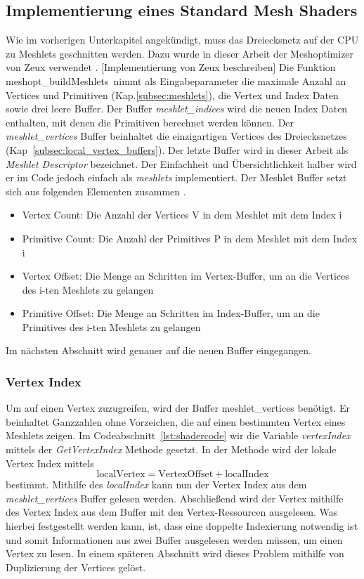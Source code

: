 \subsection{Implementierung eines Standard Mesh Shaders}
\label{subsec:standard_meshshaderimpl}
Wie im vorherigen Unterkapitel angekündigt, muss das Dreiecksnetz auf der CPU zu Meshlets geschnitten werden. 
Dazu wurde in dieser Arbeit der Meshoptimizer von Zeux verwendet \cite{Zeux}. 
[Implementierung von Zeux beschreiben]
Die Funktion \glqq meshopt\_buildMeshlets\grqq\ nimmt als Eingabeparameter die maximale Anzahl an Vertices und Primitiven (Kap.\ref{subsec:meshlets}), die Vertex und Index Daten sowie drei leere Buffer.
Der Buffer \textit{meshlet\_indices} wird die neuen Index Daten enthalten, mit denen die Primitiven berechnet werden können.
Der \textit{meshlet\_vertices} Buffer beinhaltet die einzigartigen Vertices des Dreiecksnetzes (Kap~\ref{subsec:local_vertex_buffers}).
Der letzte Buffer wird in dieser Arbeit als \textit{Meshlet Descriptor} bezeichnet.
Der Einfachheit und Übersichtlichkeit halber wird er im Code jedoch einfach als \textit{meshlets} implementiert.
Der Meshlet Buffer setzt sich aus folgenden Elementen zusammen \cite{Jensen2023}.
\begin{itemize}
\item Vertex Count: Die Anzahl der Vertices V in dem Meshlet mit dem Index i
\item Primitive Count: Die Anzahl der Primitives P in dem Meshlet mit dem Index i
\item Vertex Offset: Die Menge an Schritten im Vertex-Buffer, um an die Vertices des i-ten Meshlets zu gelangen
\item Primitive Offset: Die Menge an Schritten im Index-Buffer, um an die Primitives des i-ten Meshlets zu gelangen
\end{itemize} 
Im nächsten Abschnitt wird genauer auf die neuen Buffer eingegangen. \newline

\subsubsection*{Vertex Index}
Um auf einen Vertex zuzugreifen, wird der Buffer meshlet\_vertices benötigt.
Er beinhaltet Ganzzahlen ohne Vorzeichen, die auf einen bestimmten Vertex eines Meshlets zeigen.
Im Codeabschnitt~\ref{lst:shadercode} wir die Variable \textit{vertexIndex} mittels der \textit{GetVertexIndex} Methode gesetzt.
In der Methode wird der lokale Vertex Index mittels
\begin{equation*}
\text{localVertex} = \text{VertexOffset} + \text{localIndex}
\end{equation*}
bestimmt. \newline
Mithilfe des \textit{localIndex} kann nun der Vertex Index aus dem \textit{meshlet\_vertices} Buffer gelesen werden.
Abschließend wird der Vertex mithilfe des Vertex Index aus dem Buffer mit den Vertex-Ressourcen ausgelesen.
Was hierbei festgestellt werden kann, ist, dass eine doppelte Indexierung notwendig ist und somit Informationen aus zwei Buffer ausgelesen werden müssen, um einen Vertex zu lesen.
In einem späteren Abschnitt wird dieses Problem mithilfe von Duplizierung der Vertices gelöst.

